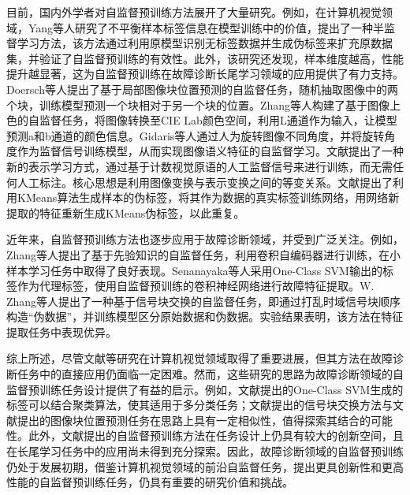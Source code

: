 \documentclass[master]{thesis-uestc}
\begin{document}
目前，国内外学者对自监督预训练方法展开了大量研究。例如，在计算机视觉领域，Yang等人研究了不平衡样本标签信息在模型训练中的价值，提出了一种半监督学习方法，该方法通过利用原模型识别无标签数据并生成伪标签来扩充原数据集，并验证了自监督预训练的有效性。此外，该研究还发现，样本维度越高，性能提升越显著，这为自监督预训练在故障诊断长尾学习领域的应用提供了有力支持。Doersch等人提出了基于局部图像块位置预测的自监督任务，随机抽取图像中的两个块，训练模型预测一个块相对于另一个块的位置。Zhang等人构建了基于图像上色的自监督任务，将图像转换至CIE Lab颜色空间，利用L通道作为输入，让模型预测a和b通道的颜色信息。Gidaris等人通过人为旋转图像不同角度，并将旋转角度作为监督信号训练模型，从而实现图像语义特征的自监督学习。文献\cite{noroozi2017representation}提出了一种新的表示学习方式，通过基于计数视觉原语的人工监督信号来进行训练，而无需任何人工标注。核心思想是利用图像变换与表示变换之间的等变关系。文献\cite{caron2018deep}提出了利用KMeans算法生成样本的伪标签，将其作为数据的真实标签训练网络，用网络新提取的特征重新生成KMeans伪标签，以此重复。

近年来，自监督预训练方法也逐步应用于故障诊断领域，并受到广泛关注。例如，Zhang等人提出了基于先验知识的自监督任务，利用卷积自编码器进行训练，在小样本学习任务中取得了良好表现。Senanayaka等人采用One-Class SVM输出的标签作为代理标签，使用自监督预训练的卷积神经网络进行故障特征提取。W. Zhang等人提出了一种基于信号块交换的自监督任务，即通过打乱时域信号块顺序构造“伪数据”，并训练模型区分原始数据和伪数据。实验结果表明，该方法在特征提取任务中表现优异。

综上所述，尽管文献\cite{doersch2015unsupervised, zhang2016colorful, gidaris2018unsupervised}等研究在计算机视觉领域取得了重要进展，但其方法在故障诊断任务中的直接应用仍面临一定困难。然而，这些研究的思路为故障诊断领域的自监督预训练任务设计提供了有益的启示。例如，文献\cite{senanayaka2020toward}提出的One-Class SVM生成的标签可以结合聚类算法，使其适用于多分类任务；文献\cite{zhang2021federated}提出的信号块交换方法与文献\cite{doersch2015unsupervised}提出的图像块位置预测任务在思路上具有一定相似性，值得探索其结合的可能性。此外，文献\cite{zhang2022prior, senanayaka2020toward, zhang2021federated}提出的自监督预训练方法在任务设计上仍具有较大的创新空间，且在长尾学习任务中的应用尚未得到充分探索。因此，故障诊断领域的自监督预训练仍处于发展初期，借鉴计算机视觉领域的前沿自监督任务，提出更具创新性和更高性能的自监督预训练任务，仍具有重要的研究价值和挑战。
\end{document}
